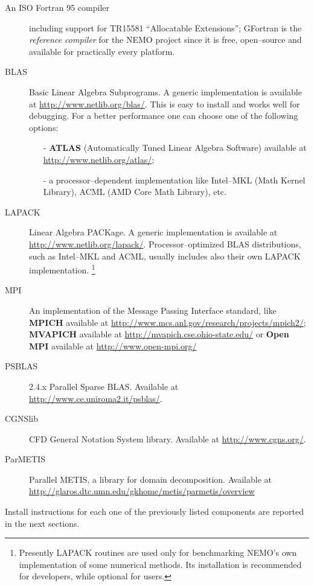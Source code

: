 \documentclass[a4paper,12pt]{article}%
\begin{document}
\begin{description}
\item [An ISO Fortran 95 compiler] including support for TR15581
    ``Allocatable Extensions'';  GFortran is the \emph{reference
    compiler} for the NEMO project since it is free, open--source and
  available for practically every platform.
\item [BLAS] Basic Linear Algebra Subprograms. A generic
  implementation is available at
  \url{http://www.netlib.org/blas/}. This is easy to install and works
  well for debugging. For a better performance one can choose
  one of the following options:
  \begin{itemize}
  \item [-] \textbf{ATLAS} (Automatically Tuned Linear Algebra
    Software) available at \url{http://www.netlib.org/atlas/};
  \item [-] a processor--dependent implementation like Intel--MKL
  (Math Kernel Library), ACML (AMD Core Math Library), etc.
  \end{itemize}
\item [LAPACK] Linear Algebra PACKage. A generic implementation is
  available at
  \url{http://www.netlib.org/lapack/}. Processor--optimized BLAS
  distributions, such as Intel--MKL and ACML, usually includes also their
  own LAPACK implementation. \footnote{Presently LAPACK routines are
    used only for benchmarking NEMO's own implementation of some
    numerical methods. Its installation is recommended for developers,
    while optional for users.}
\item [MPI] An implementation of the Message Passing Interface standard, 
 like {\bf MPICH} available at \url{http://www.mcs.anl.gov/research/projects/mpich2/};  
{\bf MVAPICH} available at \url{http://mvapich.cse.ohio-state.edu/} or 
{\bf Open MPI} available at \url{http://www.open-mpi.org/}
  
\item [PSBLAS] 2.4.x Parallel Sparse BLAS. Available at
  \url{http://www.ce.uniroma2.it/psblas/}.
\item [CGNSlib] CFD General Notation System library. Available at
  \url{http://www.cgns.org/}.
\item [ParMETIS] Parallel METIS, a library for domain
  decomposition. Available at
  \url{http://glaros.dtc.umn.edu/gkhome/metis/parmetis/overview}
\end{description} 
Install instructions for each one of the previously listed components
are reported in the next sections. 
\end{document}
